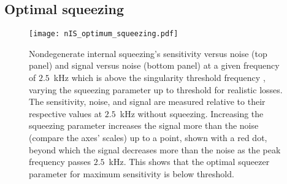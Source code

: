 \subsection{Optimal squeezing}
\label{sec:nIS_optimal_squeezing}

\begin{figure}
	\centering
	\texttt{[image: nIS\_optimum\_squeezing.pdf]}
	\caption{  Nondegenerate internal squeezing's sensitivity versus noise (top panel) and signal versus noise (bottom panel) at a given frequency of $2.5$~kHz which is above the singularity threshold frequency , varying the squeezing parameter up to threshold for realistic losses. The sensitivity, noise, and signal are measured relative to their respective values at $2.5$~kHz without squeezing. Increasing the squeezing parameter increases the signal more than the noise (compare the axes' scales) up to a point, shown with a red dot, beyond which the signal decreases more than the noise as the peak frequency passes $2.5$~kHz. This shows that the optimal squeezer parameter  for maximum sensitivity is below threshold.
    }
	\label{fig:nIS_optimum_squeezing}
\end{figure}


